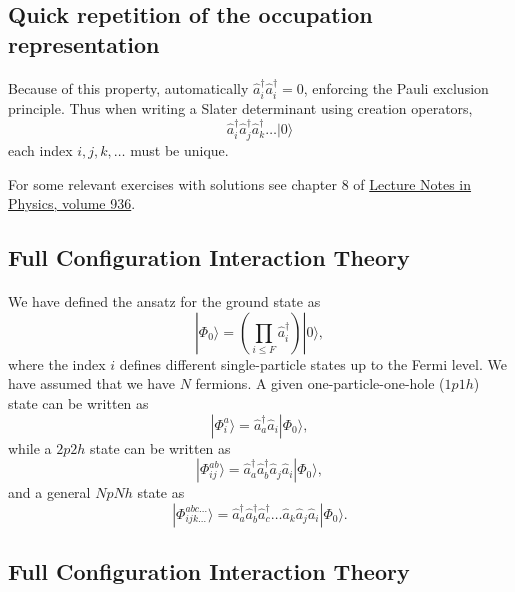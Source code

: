 \subsection*{Quick repetition  of the occupation representation}

\paragraph{}
Because of this property, automatically $\hat{a}^\dagger_i \hat{a}^\dagger_i = 0$, 
enforcing the Pauli exclusion principle.  Thus when writing a Slater determinant 
using creation operators, 
\[
\hat{a}^\dagger_i \hat{a}^\dagger_j \hat{a}^\dagger_k \ldots |0 \rangle
\]
each index $i,j,k, \ldots$ must be unique.

For some relevant exercises with solutions see chapter 8 of \href{{http://www.springer.com/us/book/9783319533353}}{Lecture Notes in Physics, volume 936}.



\subsection*{Full Configuration Interaction Theory}

\paragraph{}
We have defined the ansatz for the ground state as 
\[
|\Phi_0\rangle = \left(\prod_{i\le F}\hat{a}_{i}^{\dagger}\right)|0\rangle,
\]
where the index $i$ defines different single-particle states up to the Fermi level. We have assumed that we have $N$ fermions. 
A given one-particle-one-hole ($1p1h$) state can be written as
\[
|\Phi_i^a\rangle = \hat{a}_{a}^{\dagger}\hat{a}_i|\Phi_0\rangle,
\]
while a $2p2h$ state can be written as
\[
|\Phi_{ij}^{ab}\rangle = \hat{a}_{a}^{\dagger}\hat{a}_{b}^{\dagger}\hat{a}_j\hat{a}_i|\Phi_0\rangle,
\]
and a general $NpNh$ state as 
\[
|\Phi_{ijk\dots}^{abc\dots}\rangle = \hat{a}_{a}^{\dagger}\hat{a}_{b}^{\dagger}\hat{a}_{c}^{\dagger}\dots\hat{a}_k\hat{a}_j\hat{a}_i|\Phi_0\rangle.
\]



\subsection*{Full Configuration Interaction Theory}

